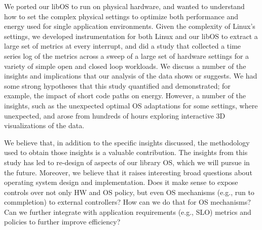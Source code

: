 
We ported our libOS to run on physical hardware, and wanted  to understand how to set the complex physical settings to optimize both performance and energy used for single application environments.
Given the complexity of Linux's settings, we developed instrumentation for both Linux and our libOS to extract a large set of metrics at every interrupt, and did a study that collected a time series log of the metrics across a sweep of a large set of hardware settings for a variety of simple open and closed loop workloads.
We discuss a number of the insights and implications that our analysis of the data shows or suggests.
We had some strong hypotheses that this study quantified and demonstrated; for example, the impact of short code paths on energy.  
However, a number of the insights, such as the unexpected optimal OS adaptations for some settings, where unexpected, and arose from hundreds of hours exploring interactive 3D visualizations of the data.

We believe that, in addition to the specific insights discussed, the  methodology used to obtain those insights is a valuable contribution.
The insights from this study has led to re-design of aspects of our library OS, which we will pursue in the future.    
Moreover, we believe that it raises interesting broad questions about operating system design and implementation.
Does it make sense to expose controls over not only HW and OS policy, but even OS mechanisms (e.g., run to commpletion) to external controllers?  
How can we do that for OS mechanisms?
Can we further integrate with application requirements (e.g., SLO)  metrics and policies to further improve efficiency?

